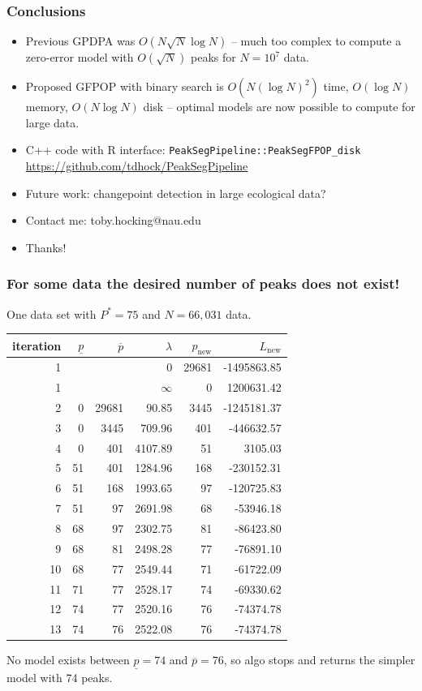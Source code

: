 \documentclass{beamer}
\begin{document}
\begin{frame}[fragile]
  \frametitle{Conclusions}

  \begin{itemize}
  \item Previous GPDPA was $O(N\sqrt N\log N)$ -- much too complex to
    compute a zero-error model with $O(\sqrt N)$ peaks for $N=10^7$
    data.
  \item Proposed GFPOP with binary search is $O(N(\log N)^2)$ time,
    $O(\log N)$ memory, $O(N\log N)$ disk -- optimal models are now
    possible to compute for large data.
  \item C++ code with R interface:
    \verb|PeakSegPipeline::PeakSegFPOP_disk|
    \url{https://github.com/tdhock/PeakSegPipeline}
  \item Future work: changepoint detection in large ecological data?
  \item Contact me: toby.hocking@nau.edu
  \item Thanks!
  \end{itemize}
  
\end{frame}

\begin{frame}
  \frametitle{For some data
 the desired number of peaks does not exist!}

One data set with $P^*=75$ and $N=66,031$ data.

\begin{tabular}{rrrrrr}
\small
 iteration& $\underline p$& $\overline p$&    $\lambda$ & $p_{\text{new}}$& $L_{\text{new}}$\\
  \hline
    1 &  &  & 0 & 29681 & -1495863.85 \\ 
    1 &  &  & $\infty$ &   0 & 1200631.42 \\ 
    2 &   0 & 29681 & 90.85 & 3445 & -1245181.37 \\ 
    3 &   0 & 3445 & 709.96 & 401 & -446632.57 \\ 
    4 &   0 & 401 & 4107.89 &  51 & 3105.03 \\ 
    5 &  51 & 401 & 1284.96 & 168 & -230152.31 \\ 
    6 &  51 & 168 & 1993.65 &  97 & -120725.83 \\ 
    7 &  51 &  97 & 2691.98 &  68 & -53946.18 \\ 
    8 &  68 &  97 & 2302.75 &  81 & -86423.80 \\ 
    9 &  68 &  81 & 2498.28 &  77 & -76891.10 \\ 
   10 &  68 &  77 & 2549.44 &  71 & -61722.09 \\ 
   11 &  71 &  77 & 2528.17 &  74 & -69330.62 \\ 
   12 &  74 &  77 & 2520.16 &  76 & -74374.78 \\ 
   13 &  \alert{74} &  \alert{76} & \alert{2522.08} &  \alert{76} & -74374.78 \\ 
\end{tabular}

\alert{No model exists between $\underline p=74$ and
  $\overline p=76$, so algo stops and returns the simpler model with 74 peaks.}

\end{frame}
\end{document}
